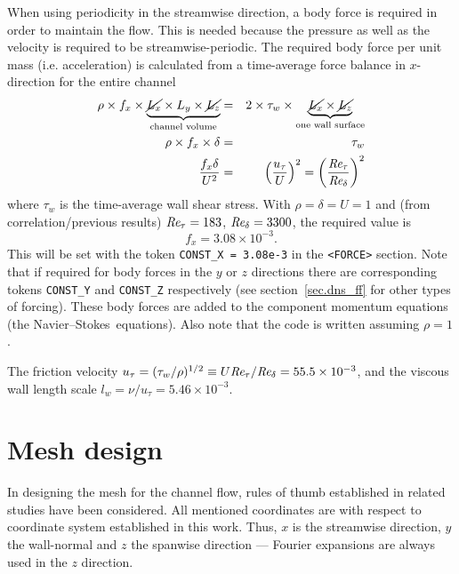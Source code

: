 \documentclass[11pt]{report}
\def\Rey{\mbox{\it Re}}                             %
\newcommand\NavSto{Navier--Stokes}
\begin{document}
When using periodicity in the streamwise direction, a body force is
required in order to maintain the flow.  This is needed because the
pressure as well as the velocity is required to be
streamwise-periodic. The required body force per unit mass
(i.e. acceleration) is calculated from a time-average force balance in
$x$-direction for the entire channel
\begin{eqnarray*}
 \rho \times f_x \times
  \underbrace{\cancel{L_x} \times L_y \times \cancel{L_z}}_{\text{channel
    volume}}  &=& 2 \times \tau_w \times \underbrace{\cancel{L_x} \times
    \cancel{L_z}}_{\text{one wall surface}} \\ 
   \rho \times f_x \times \delta & = & \tau_w\\
    \frac{f_x\delta}{U^2} & = & \left(\frac{u_\tau}{U}\right)^2 = 
    \left(\frac{\Rey_\tau}{\Rey_\delta}\right)^2
  \label{eq:force_balance}
\end{eqnarray*}
where $\tau_w$ is the time-average wall shear stress.  With $\rho =
\delta = U= 1$ and (from correlation/previous results)
$\Rey_\tau=183$, $\Rey_\delta=3300$, the required value is
\[
  f_x = 3.08 \times 10^{-3} .
\]
This will be set with the token \texttt{CONST\_X = 3.08e-3} in the 
\texttt{<FORCE>} section.  Note that if
required for body forces in the $y$ or $z$ directions there are
corresponding tokens \texttt{CONST\_Y} and \texttt{CONST\_Z} respectively 
(see section~\ref{sec.dns_ff} for other types of forcing).
These body forces are added to the component momentum equations (the
\NavSto\ equations).  Also note that the code is written assuming
$\rho=1$.

The friction velocity $u_\tau=(\tau_w/\rho)^{1/2}\equiv
U\Rey_\tau/\Rey_\delta=55.5\times10^{-3}$, and the viscous wall length
scale $l_w=\nu/u_\tau=5.46\times10^{-3}$.

\section{Mesh design}

In designing the mesh for the channel flow, rules of thumb established
in related studies \citep{pio97,kmm87,blsc03} have been
considered. All mentioned coordinates are with respect to coordinate
system established in this work. Thus, $x$ is the streamwise
direction, $y$ the wall-normal and $z$ the spanwise direction ---
Fourier expansions are always used in the $z$ direction.
\end{document}
